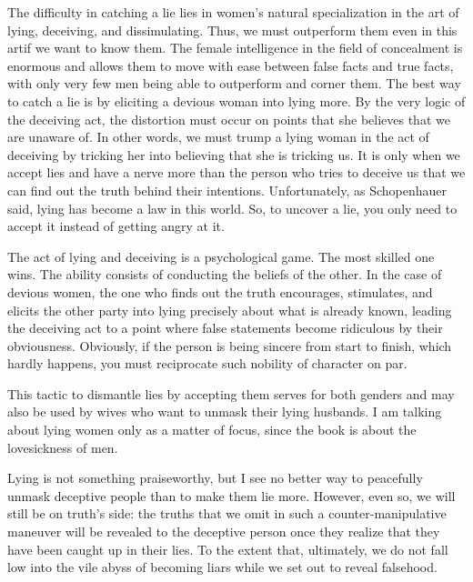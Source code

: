 \par The difficulty in catching a lie lies in women's natural specialization in the art of lying, deceiving, and dissimulating. Thus, we must outperform them even in this art\footnotemark[42] if we want to know them. The female intelligence in the field of concealment is enormous and allows them to move with ease between false facts and true facts, with only very few men being able to outperform and corner them. The best way to catch a lie is by eliciting a devious woman into lying more. By the very logic of the deceiving act, the distortion must occur on points that she believes that we are unaware of. In other words, we must trump a lying woman in the act of deceiving by tricking her into believing that she is tricking us. It is only when we accept lies and have a nerve more than the person who tries to deceive us that we can find out the truth behind their intentions. Unfortunately, as Schopenhauer said, lying has become a law in this world. So, to uncover a lie, you only need to accept it instead of getting angry at it.


\par The act of lying and deceiving is a psychological game. The most skilled one wins. The ability consists of conducting the beliefs of the other. In the case of devious women, the one who finds out the truth encourages, stimulates, and elicits the other party into lying precisely about what is already known, leading the deceiving act to a point where false statements become ridiculous by their obviousness. Obviously, if the person is being sincere from start to finish, which hardly happens, you must reciprocate such nobility of character on par.

\par This tactic to dismantle lies by accepting them serves for both genders and may also be used by wives who want to unmask their lying husbands. I am talking about lying women only as a matter of focus, since the book is about the lovesickness of men.

\par Lying is not something praiseworthy, but I see no better way to peacefully unmask deceptive people than to make them lie more. However, even so, we will still be on truth's side: the truths that we omit in such a counter-manipulative maneuver will be revealed to the deceptive person once they realize that they have been caught up in their lies. To the extent that, ultimately, we do not fall low into the vile abyss of becoming liars while we set out to reveal falsehood.

